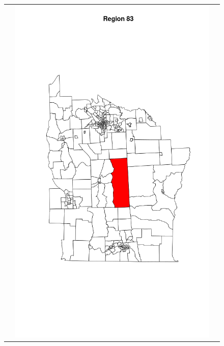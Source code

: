 \documentclass[12pt]{article}
\begin{document}
\begin{figure}[!ht]
\begin{tabular}{|c|c|c|}
			  & \includegraphics[scale=0.18]{ny83.png}

\end{tabular}
\end{figure}
\end{document}
